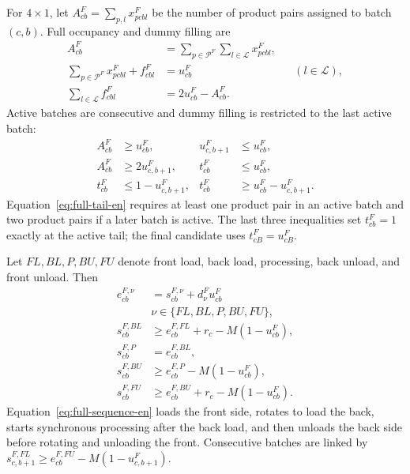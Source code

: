 \documentclass[journal]{IEEEtran}
\begin{document}
For $4\times1$, let $A^F_{cb}=\sum_{p,l}x^F_{pcbl}$ be the number of product pairs assigned to batch $(c,b)$. Full occupancy and dummy filling are
\begin{equation}
\begin{aligned}
A^F_{cb}&=\sum_{p\in\mathcal P^F}\sum_{l\in\mathcal L}x^F_{pcbl},\\
\sum_{p\in\mathcal P^F}x^F_{pcbl}+f^F_{cbl}&=u^F_{cb}
&& (l\in\mathcal L),\\
\sum_{l\in\mathcal L}f^F_{cbl}&=2u^F_{cb}-A^F_{cb}.
\end{aligned}
\label{eq:full-capacity-en}
\end{equation}
Active batches are consecutive and dummy filling is restricted to the last active batch:
\begin{equation}
\begin{aligned}
A^F_{cb}&\ge u^F_{cb}, &u^F_{c,b+1}&\le u^F_{cb},\\
A^F_{cb}&\ge2u^F_{c,b+1},
&t^F_{cb}&\le u^F_{cb},\\
t^F_{cb}&\le1-u^F_{c,b+1},
&t^F_{cb}&\ge u^F_{cb}-u^F_{c,b+1}.
\end{aligned}
\label{eq:full-tail-en}
\end{equation}
Equation~\eqref{eq:full-tail-en} requires at least one product pair in an active batch and two product pairs if a later batch is active. The last three inequalities set $t^F_{cb}=1$ exactly at the active tail; the final candidate uses $t^F_{cB}=u^F_{cB}$.

Let $FL,BL,P,BU,FU$ denote front load, back load, processing, back unload, and front unload. Then
\begin{equation}
\begin{aligned}
e^{F,\nu}_{cb}&=s^{F,\nu}_{cb}+d^{F}_{\nu}u^F_{cb}
\\[-1pt]&\nu\in\{FL,BL,P,BU,FU\},\\
s^{F,BL}_{cb}&\ge e^{F,FL}_{cb}+r_c-M(1-u^F_{cb}),\\
s^{F,P}_{cb}&=e^{F,BL}_{cb},\\
s^{F,BU}_{cb}&\ge e^{F,P}_{cb}-M(1-u^F_{cb}),\\
s^{F,FU}_{cb}&\ge e^{F,BU}_{cb}+r_c-M(1-u^F_{cb}).
\end{aligned}
\label{eq:full-sequence-en}
\end{equation}
Equation~\eqref{eq:full-sequence-en} loads the front side, rotates to load the back, starts synchronous processing after the back load, and then unloads the back side before rotating and unloading the front. Consecutive batches are linked by $s^{F,FL}_{c,b+1}\ge e^{F,FU}_{cb}-M(1-u^F_{c,b+1})$.
\end{document}
